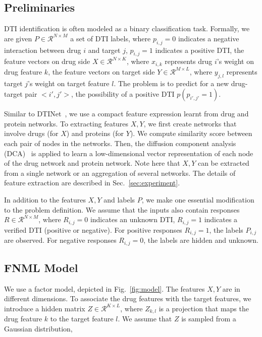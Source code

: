 \documentclass[journal]{IEEEtran}
\begin{document}
\subsection{Preliminaries}\label{sec:input}
DTI identification is often modeled as a binary classification task. Formally, we are given $P\in \mathcal{R}^{N\times M}$ a set of DTI labels, where $p_{i,j}=0$ indicates a negative interaction between drug $i$ and target $j$, $p_{i,j}=1$ indicates a positive DTI, the feature vectors on drug side $X\in \mathcal{R}^{N \times K}$, where $x_{i,k}$ represents drug $i$'s weight on drug feature $k$, the feature vectors on target side $Y\in \mathcal{R}^{M \times L}$, where $y_{j,l}$ represents target $j$'s weight on target feature $l$. The problem is to predict for a new drug-target pair $<i',j'>$, the possibility of a positive DTI $p(p_{i',j'}=1)$.

Similar to DTINet~\cite{Luo2017Network}, we use a compact feature expression learnt from drug and protein networks. To extracting features $X,Y$, we first create networks that involve drugs (for $X$) and proteins (for $Y$). We compute similarity score between each pair of nodes in the networks. Then, the diffusion component analysis (DCA)~\cite{Cho2015DCA} is applied to learn a low-dimensional vector representation of each node of the drug network and protein network. Note here that $X,Y$ can be extracted from a single network or an aggregation of several networks. The details of feature extraction are described in Sec.~\ref{sec:experiment}.

In addition to the features $X,Y$ and labels $P$, we make one essential modification to the problem definition. We assume that the inputs also contain responses $R\in \mathcal{R}^{N\times M}$, where $R_{i,j}=0$ indicates an unknown DTI, $R_{i,j}=1$ indicates a verified DTI (positive or negative). For positive responses $R_{i,j}=1$, the labels $P_{i,j}$ are observed. For negative responses $R_{i,j}=0$, the labels are hidden and unknown.

\subsection{FNML Model}\label{sec:model}

We use a factor model, depicted in Fig.~\ref{fig:model}. The features $X,Y$ are in different dimensions. To associate the drug features with the target features, we introduce a hidden matrix $Z\in\mathcal{R}^{K\times L}$, where $Z_{k,l}$ is a projection that maps the drug feature $k$ to the target feature $l$. We assume that $Z$ is sampled from a Gaussian distribution,
\end{document}
